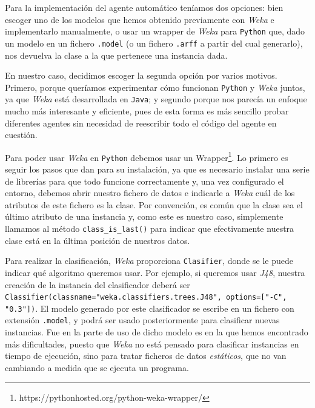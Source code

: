 \documentclass[12pt]{article}
\begin{document}
Para la implementación del agente automático teníamos dos opciones: bien escoger uno de los modelos que hemos obtenido previamente con \emph{Weka} e implementarlo manualmente, o usar un wrapper de \emph{Weka} para \texttt{Python} que, dado un modelo en un fichero \texttt{.model} (o un fichero \texttt{.arff} a partir del cual generarlo), nos devuelva la clase a la que pertenece una instancia dada.

En nuestro caso, decidimos escoger la segunda opción por varios motivos. Primero, porque queríamos experimentar cómo funcionan \texttt{Python} y \emph{Weka} juntos, ya que \emph{Weka} está desarrollada en \texttt{Java}; y segundo porque nos parecía un enfoque mucho más interesante y eficiente, pues de esta forma es más sencillo probar diferentes agentes sin necesidad de reescribir todo el código del agente en cuestión.

Para poder usar \emph{Weka} en \texttt{Python} debemos usar un Wrapper\footnote{https://pythonhosted.org/python-weka-wrapper/}. Lo primero es seguir los pasos que dan para su instalación, ya que es necesario instalar una serie de librerías para que todo funcione correctamente y, una vez configurado el entorno, debemos abrir nuestro fichero de datos e indicarle a \emph{Weka} cuál de los atributos de este fichero es la clase. Por convención, es común que la clase sea el último atributo de una instancia y, como este es nuestro caso, simplemente llamamos al método \texttt{class\_is\_last()} para indicar que efectivamente nuestra clase está en la última posición de nuestros datos.

\newpage

Para realizar la clasificación, \emph{Weka} proporciona \texttt{Clasifier}, donde se le puede indicar qué algoritmo queremos usar. Por ejemplo, si queremos usar \emph{J48}, nuestra creación de la instancia del clasificador deberá ser \texttt{Classifier(classname="weka.classifiers.trees.J48", options=["-C", "0.3"])}. El modelo generado por este clasificador se escribe en un fichero con extensión \texttt{.model}, y podrá ser usado posteriormente para clasificar nuevas instancias. Fue en la parte de uso de dicho modelo es en la que hemos encontrado más dificultades, puesto que \emph{Weka} no está pensado para clasificar instancias en tiempo de ejecución, sino para tratar ficheros de datos \emph{estáticos}, que no van cambiando a medida que se ejecuta un programa.

\vspace{0.5cm}
\end{document}
